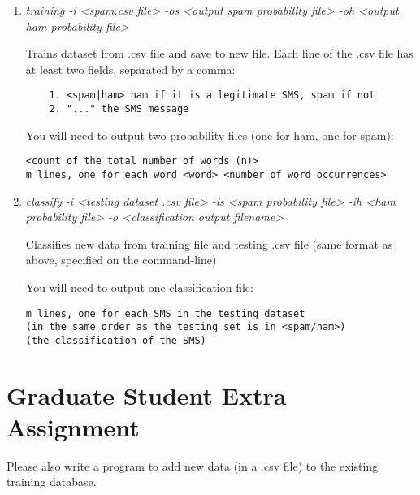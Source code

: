 \documentclass[twoside,10pt]{article}
\begin{document}
\begin{enumerate}
    \item

          \textit{training -i \textless{}spam.csv file\textgreater{} -os \textless{}output spam probability file\textgreater{} -oh \textless{}output ham probability file\textgreater{}}

          Trains dataset from .csv file and save to new file. Each line of the
          .csv file has at least two fields, separated by a comma:

          \begin{verbatim}
    1. <spam|ham> ham if it is a legitimate SMS, spam if not
    2. "..." the SMS message
\end{verbatim}

          You will need to output two probability files (one for ham, one for
          spam):

          \begin{verbatim}
<count of the total number of words (n)>
m lines, one for each word <word> <number of word occurrences>
\end{verbatim}
    \item
          \textit{classify -i \textless{}testing dataset .csv file\textgreater{} -is \textless{}spam probability file\textgreater{} -ih \textless{}ham probability file\textgreater{} -o \textless{}classification output filename\textgreater{}}

          Classifies new data from training file and testing .csv file (same
          format as above, specified on the command-line)

          You will need to output one classification file:

          \begin{verbatim}
m lines, one for each SMS in the testing dataset
(in the same order as the testing set is in <spam/ham>)
(the classification of the SMS)
\end{verbatim}
\end{enumerate}

\section*{Graduate Student Extra
  Assignment}\label{graduate-student-extra-assignment}

Please also write a program to add new data (in a .csv file) to the
existing training database. \\
\end{document}
